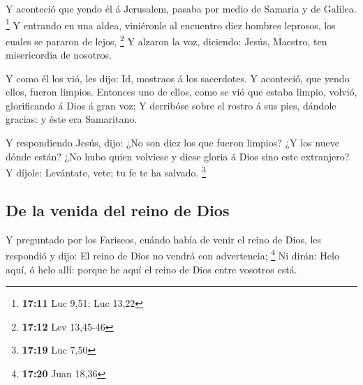 Y aconteció que yendo él á Jerusalem, pasaba por medio de
Samaria y de Galilea. \footnote{\textbf{17:11} Luc 9,51; Luc 13,22}
 Y entrando en una aldea, viniéronle al encuentro diez
hombres leprosos, los cuales se pararon de lejos, \footnote{\textbf{17:12}
  Lev 13,45-46}  Y alzaron la voz, diciendo: Jesús,
Maestro, ten misericordia de nosotros.

 Y como él los vió, les dijo: Id, mostraos á los
sacerdotes. Y aconteció, que yendo ellos, fueron limpios. 
Entonces uno de ellos, como se vió que estaba limpio, volvió,
glorificando á Dios á gran voz;  Y derribóse sobre el
rostro á sus pies, dándole gracias: y éste era Samaritano.

 Y respondiendo Jesús, dijo: ¿No son diez los que fueron
limpios? ¿Y los nueve dónde están?  ¿No hubo quien volviese
y diese gloria á Dios sino este extranjero?  Y díjole:
Levántate, vete; tu fe te ha salvado. \footnote{\textbf{17:19} Luc 7,50}

\hypertarget{de-la-venida-del-reino-de-dios}{%
\subsection{De la venida del reino de
Dios}\label{de-la-venida-del-reino-de-dios}}

 Y preguntado por los Fariseos, cuándo había de venir el
reino de Dios, les respondió y dijo: El reino de Dios no vendrá con
advertencia; \footnote{\textbf{17:20} Juan 18,36}  Ni
dirán: Helo aquí, ó helo allí: porque he aquí el reino de Dios entre
vosotros está.

